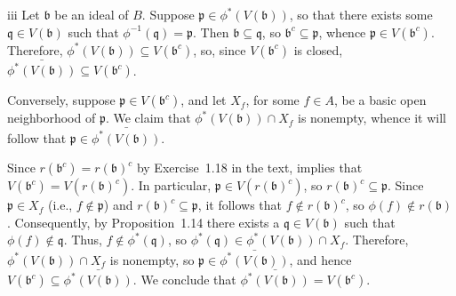 \begin{partsolution}{iii}
Let \(\mathfrak{b}\) be an ideal of \(B\).
Suppose \(\mathfrak{p} \in \phi^*(V(\mathfrak{b}))\), so that there exists some \(\mathfrak{q} \in V(\mathfrak{b})\) such that \(\phi^{-1}(\mathfrak{q}) = \mathfrak{p}\).
Then \(\mathfrak{b} \subseteq \mathfrak{q}\), so \(\mathfrak{b}^c \subseteq \mathfrak{p}\), whence \(\mathfrak{p} \in V(\mathfrak{b}^c)\).
Therefore, \(\phi^*(V(\mathfrak{b})) \subseteq V(\mathfrak{b}^c)\), so, since \(V(\mathfrak{b}^c)\) is closed, \(\bar{\phi^*(V(\mathfrak{b}))} \subseteq V(\mathfrak{b}^c)\).

Conversely, suppose \(\mathfrak{p} \in V(\mathfrak{b}^c)\), and let \(X_f\), for some \(f \in A\), be a basic open neighborhood of \(\mathfrak{p}\).
We claim that \(\phi^*(V(\mathfrak{b})) \cap X_f\) is nonempty, whence it will follow that \(\mathfrak{p} \in \bar{\phi^*(V(\mathfrak{b}))}\).

Since \(r(\mathfrak{b}^c) = r(\mathfrak{b})^c\) by Exercise~1.18 in the text,  implies that \(V(\mathfrak{b}^c) = V(r(\mathfrak{b})^c)\).
In particular, \(\mathfrak{p} \in V(r(\mathfrak{b})^c)\), so \(r(\mathfrak{b})^c \subseteq \mathfrak{p}\).
Since \(\mathfrak{p} \in X_f\) (i.e., \(f \notin \mathfrak{p}\)) and \(r(\mathfrak{b})^c \subseteq \mathfrak{p}\), it follows that \(f \notin r(\mathfrak{b})^c\), so \(\phi(f) \notin r(\mathfrak{b})\).
Consequently, by Proposition~1.14 there exists a \(\mathfrak{q} \in V(\mathfrak{b})\) such that \(\phi(f) \notin \mathfrak{q}\).
Thus, \(f \notin \phi^*(\mathfrak{q})\), so \(\phi^*(\mathfrak{q}) \in \phi^*(V(\mathfrak{b})) \cap X_f\).
Therefore, \(\phi^*(V(\mathfrak{b})) \cap X_f\) is nonempty, so \(\mathfrak{p} \in \bar{\phi^*(V(\mathfrak{b}))}\), and hence \(V(\mathfrak{b}^c) \subseteq \bar{\phi^*(V(\mathfrak{b}))}\).
We conclude that \(\bar{\phi^*(V(\mathfrak{b}))} = V(\mathfrak{b}^c)\).
\end{partsolution}

